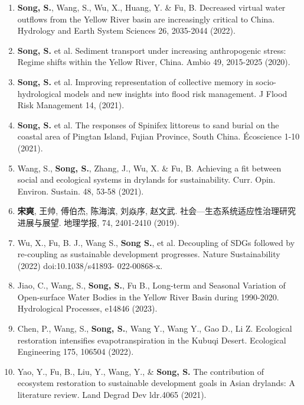 
\begin{paper}
\begin{enumerate}
	\item \textbf{Song, S.}, Wang, S., Wu, X., Huang, Y. \& Fu, B. Decreased virtual water outflows from the Yellow River basin are increasingly critical to China. Hydrology and Earth System Sciences 26, 2035-2044 (2022). %
	\item \textbf{Song, S.} et al. Sediment transport under increasing anthropogenic stress: Regime shifts within the Yellow River, China. Ambio 49, 2015-2025 (2020). %
	\item \textbf{Song, S.} et al. Improving representation of collective memory in socio-hydrological models and new insights into flood risk management. J Flood Risk Management 14, (2021). %
	\item \textbf{Song, S.} et al. The responses of Spinifex littoreus to sand burial on the coastal area of Pingtan Island, Fujian Province, South China. Écoscience 1-10 (2021). %
	\item Wang, S., \textbf{Song, S.}, Zhang, J., Wu, X. \& Fu, B. Achieving a fit between social and ecological systems in drylands for sustainability. Curr. Opin. Environ. Sustain. 48, 53-58 (2021). %
	\item \textbf{宋爽}, 王帅, 傅伯杰, 陈海滨, 刘焱序, 赵文武. 社会—生态系统适应性治理研究进展与展望. 地理学报, 74, 2401-2410 (2019). %
	\item Wu, X., Fu, B. J., Wang S., \textbf{Song S.}, et al. Decoupling of SDGs followed by re-coupling as sustainable development progresses. Nature Sustainability (2022) doi:10.1038/s41893- 022-00868-x. %
	\item Jiao, C., Wang, S., \textbf{Song, S.}, Fu B., Long-term and Seasonal Variation of Open-surface Water Bodies in the Yellow River Basin during 1990-2020. Hydrological Processes, e14846 (2023).
	\item Chen, P., Wang, S., \textbf{Song, S.}, Wang Y., Wang Y., Gao D., Li Z. Ecological restoration intensifies evapotranspiration in the Kubuqi Desert. Ecological Engineering 175, 106504 (2022). %
	\item Yao, Y., Fu, B., Liu, Y., Wang, Y., \& \textbf{Song, S.} The contribution of ecosystem restoration to sustainable development goals in Asian drylands: A literature review. Land Degrad Dev ldr.4065 (2021). %

\end{enumerate}
\end{paper}
